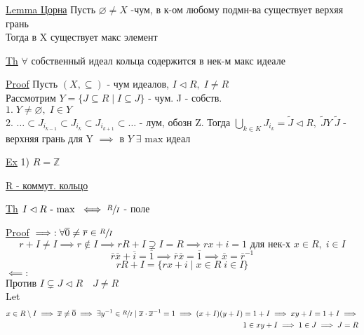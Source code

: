 \documentclass[a4paper]{article}
\begin{document}
\begin{tcolorbox}
    \underline{Lemma Цорна} Пусть $ \varnothing \neq X $ -чум, в к-ом любому подмн-ва
    существует верхяя грань\\
    Тогда в X существует макс элемент

    \underline{Th} $ \forall $ собственный идеал кольца содержится в нек-м макс идеале

    \underline{Proof} Пусть $ (X, \subseteq) $ - чум идеалов, $ I \lhd R, \; I \neq R $ \\
    Рассмотрим $ Y = \{ J \subseteq R \; | \; I \subseteq J\} $ - чум.  J - собств.\\
    $1. \; Y \neq \varnothing, \; I \in Y$\\
    2. $ \dots \subset J_{i_{k-1}} \subset J_{i_k} \subset J_{i_{k+1}}\subset \dots $ - лум,
    обозн Z. Тогда $ \bigcup_{k \in K} J_{i_k} = \tilde{J} \lhd R, \; \tilde{J} Y\; 
    \tilde{J}$ - верхняя грань для Y $ \implies \text{ в } Y \;\exists \text{ max идеал} $ 
\end{tcolorbox}

\underline{Ex} 1) $ R = \mathbb{Z} $ 

\begin{tcolorbox}
    \underline{R - коммут. кольцо}

    \underline{Th} $ I \lhd R \text{ - max } \iff \sfrac{R}{I} $ - поле

    \underline{Proof} $ \implies:  \forall \overline{0} \neq \overline{r} \in \sfrac{R}{I} $\\
    \[
        r + I \neq I \implies r \notin I \implies rR + I \supsetneq I = R \implies
        rx + i = 1 \text{ для нек-х } x\in R , \; i \in I
    \]
    \[
        \overline{r} \overline{x} + \overline{i} = \overline{1} \implies \overline{r}
        \overline{x} = \overline{1} \implies \overline{x} = \overline{r}^{-1}
    \]
    \[
        rR + I = \{ rx + i \; |\; x \in R \; i \in I\}
    \]
    $ \impliedby: $\\
    Против $ I \subsetneq J \lhd R \quad J \neq R $ \\
    Let
    \begin{equation*}
        \begin{aligned}
        x \in R \setminus I \implies \overline{x} \neq \overline{0} \implies
        \exists y^{-1}\in \sfrac{R}{I} \; | \; \overline{x} \cdot \overline{x}^{-1}
        = 1 \implies (x + I)(y+I) = 1 + I \implies xy + I = 1 + I \implies\\
        1 \in xy + I \implies 1 \in J \implies J = R
        \end{aligned}
    \end{equation*}
\end{tcolorbox}
\end{document}
